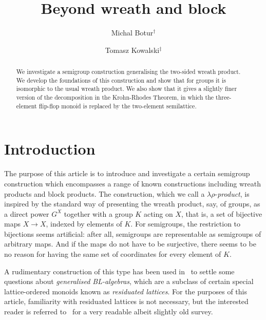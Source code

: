 \documentclass{amsart}
\title{Beyond wreath and block}
\author[Botur]{Michal Botur$^\dag$}
\author[Kowalski]{Tomasz Kowalski$^\ddag$}
\begin{document}
\begin{abstract}
We investigate a semigroup construction generalising the two-sided
wreath product.  We develop the foundations of this construction
and show that for groups it is isomorphic to the usual
wreath product. We also show that it gives a 
slightly finer version of the decomposition in the 
Krohn-Rhodes Theorem, in which the three-element flip-flop monoid is replaced by
the two-element semilattice. 
\end{abstract}  

\maketitle

\section{Introduction}\label{intro}

The purpose of this article is to introduce and investigate a certain semigroup
construction which encompasses a range of known constructions including
wreath products and block products.
The construction, which we call a $\lambda\rho$-\emph{product},
is inspired by the standard way of presenting the wreath product, 
say, of groups, as a direct power $G^X$ together with a group $K$ acting on $X$,
that is, a set of bijective maps $X\to X$, indexed by
elements of $K$. For semigroups, the restriction to bijections seems artificial: after
all, semigroups are representable as semigroups of arbitrary maps. And if the
maps do not have to be surjective, there seems to be no reason for having the
same set of coordinates for every element of $K$.  

A rudimentary construction of this type has been used in~\cite{JM06}
to settle some questions about \emph{generalised BL-algebras}, which are
a subclass of certain special lattice-ordered monoids known as
\emph{residuated lattices}. For the purposes of this article, familiarity with
residuated lattices is not necessary, but the interested reader is referred
to~\cite{JT02} for a very readable albeit slightly old survey.
\end{document}
